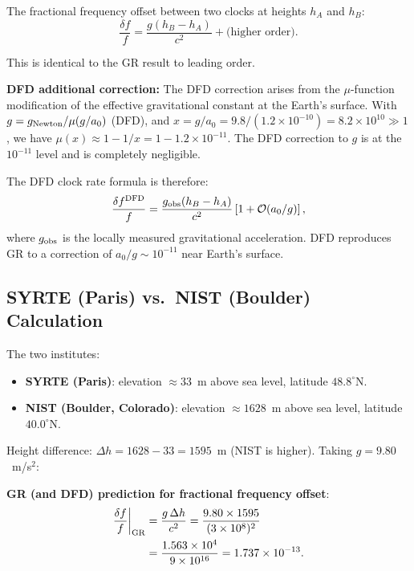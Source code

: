 \documentclass[aps,prd,twocolumn,superscriptaddress,nofootinbib]{revtex4-2}
\newcommand{\order}[1]{\mathcal{O}(#1)}
\begin{document}
The fractional frequency offset between two clocks at heights $h_A$
and $h_B$:
\begin{equation}
\frac{\delta f}{f} = \frac{g(h_B - h_A)}{c^2} + \text{(higher order)}.
\label{eq:clock_rate}
\end{equation}

This is identical to the GR result to leading order.

\textbf{DFD additional correction:}
The DFD correction arises from the $\mu$-function modification of
the effective gravitational constant at the Earth's surface.
With $g = g_{\rm Newton}/\mu(g/a_0)$ (DFD), and
$x = g/a_0 = 9.8/(1.2\times10^{-10}) = 8.2\times10^{10} \gg 1$,
we have $\mu(x) \approx 1 - 1/x = 1 - 1.2\times10^{-11}$. The DFD
correction to $g$ is at the $10^{-11}$ level and is completely
negligible.

The DFD clock rate formula is therefore:
\begin{equation}
\frac{\delta f^{\rm DFD}}{f} = \frac{g_{\rm obs}(h_B - h_A)}{c^2}
\left[1 + \order{a_0/g}\right],
\end{equation}
where $g_{\rm obs}$ is the locally measured gravitational acceleration.
DFD reproduces GR to a correction of $a_0/g \sim 10^{-11}$ near
Earth's surface.

\subsection{SYRTE (Paris) vs.\ NIST (Boulder) Calculation}

The two institutes:
\begin{itemize}
\item \textbf{SYRTE (Paris)}: elevation $\approx 33$~m above sea level,
      latitude $48.8^\circ$N.
\item \textbf{NIST (Boulder, Colorado)}: elevation $\approx 1628$~m
      above sea level, latitude $40.0^\circ$N.
\end{itemize}

Height difference: $\Delta h = 1628 - 33 = 1595$~m (NIST is higher).
Taking $g = 9.80$~m/s$^2$:

\textbf{GR (and DFD) prediction for fractional frequency offset}:
\begin{align}
\frac{\delta f}{f}\bigg|_{\rm GR}
&= \frac{g\,\Delta h}{c^2}
= \frac{9.80\times1595}{(3\times10^8)^2} \nonumber\\
&= \frac{1.563\times10^4}{9\times10^{16}}
= 1.737\times10^{-13}.
\label{eq:syrte_nist_gr}
\end{align}
\end{document}
